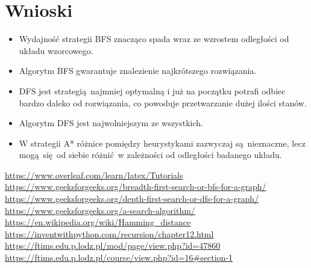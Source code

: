 \documentclass{classrep}
\begin{document}
\section{Wnioski}
\begin{itemize}
	\item Wydajność strategii BFS znacząco spada wraz ze wzrostem odległości od układu wzorcowego.
	\item Algorytm BFS gwarantuje znalezienie najkrótszego rozwiązania.
	\item DFS jest strategią najmniej optymalną i już na początku potrafi odbiec bardzo daleko od rozwiązania, co 
	powoduje przetwarzanie dużej ilości stanów.
	\item Algorytm DFS jest najwolniejszym ze wszystkich.
	\item W strategii A* różnice pomiędzy heurystykami zazwyczaj są nieznaczne, lecz mogą się od siebie różnić w 
	zależności od odległości badanego układu.
\end{itemize}

\begin{thebibliography}{0}
   \url{https://www.overleaf.com/learn/latex/Tutorials}
   \url{https://www.geeksforgeeks.org/breadth-first-search-or-bfs-for-a-graph/}
   \url{https://www.geeksforgeeks.org/depth-first-search-or-dfs-for-a-graph/}
   \url{https://www.geeksforgeeks.org/a-search-algorithm/}
   \url{https://en.wikipedia.org/wiki/Hamming_distance}
   \url{https://inventwithpython.com/recursion/chapter12.html}
   \url{https://ftims.edu.p.lodz.pl/mod/page/view.php?id=47860}
   \url{https://ftims.edu.p.lodz.pl/course/view.php?id=16#section-1}
\end{thebibliography}
\end{document}
